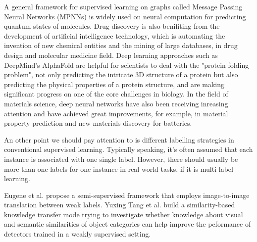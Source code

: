 \documentclass[10pt,twocolumn,letterpaper]{article}
\begin{document}
A general framework for supervised learning on graphs called Message Passing Neural Networks (MPNNs) is widely used on neural computation for predicting quantum states of molecules.
Drug discovery is also benifiting from the development of artificial intelligence technology, which is automating the invention of new chemical entities and the mining of large databases, in drug design and molecular medicine field.  
Deep learning approaches such as DeepMind's AlphaFold are helpful for scientists to deal with the "protein folding problem", not only predicting the intricate 3D structure of a protein but also predicting the physical properties of a protein structure, and are making significant progress on one of the core challenges in biology.
In the field of materials science, deep neural networks have also been receiving inreasing attention and have achieved great improvements, for example, in material property prediction and new materials discovery for batteries.

An other point we should pay attention to is different labelling strategies in conventional supervised learning.
Typically speaking, it's often assumed that each instance is associated with one single label. However, there should usually be more than one labels for one instance in real-world tasks, if it is multi-label learning.



Eugene et al. propose a semi-supervised framework that employs image-to-image translation between weak labels.
Yuxing Tang et al. build a similarity-based knowledge transfer mode trying to investigate whether knowledge about visual and semantic similarities of object categories can help improve the peformance of detectors trained in a weakly supervised setting.
\end{document}
